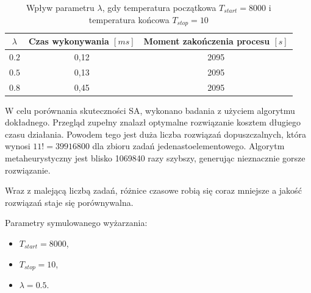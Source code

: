 \begin{table}[H]
	\centering
	\caption{Wpływ parametru $\lambda$, gdy temperatura początkowa $T_{start}=8000$ i temperatura końcowa $T_{stop}=10$}
	\label{lamda_sa_3}
	\begin{tabular}{ccc}
		\toprule
		$\lambda$ & Czas wykonywania $[ms]$ & Moment zakończenia procesu $[s]$ \\
		\midrule
		$0.2$     & 0,12                    & 2095                              \\
		$0.5$     & 0,13                    & 2095                              \\
		$0.8$     & 0,45                    & 2095                              \\
		\bottomrule
	\end{tabular}
\end{table}

W celu porównania skuteczności SA, wykonano badania z użyciem algorytmu dokładnego. Przegląd zupełny znalazł optymalne rozwiązanie kosztem długiego czasu działania. Powodem tego jest duża liczba rozwiązań dopuszczalnych, która wynosi $11! = 39916800$ dla zbioru zadań jedenastoelementowego. Algorytm metaheurystyczny jest blisko 1069840 razy szybszy, generując nieznacznie gorsze rozwiązanie.

Wraz z malejącą liczbą zadań, różnice czasowe robią się coraz mniejsze a jakość rozwiązań staje się porównywalna.

\newpage
Parametry symulowanego wyżarzania:
\begin{itemize}
	\item $T_{start}=8000$,
	\item $T_{stop}=10$,
	\item $\lambda=0.5$.
\end{itemize}

